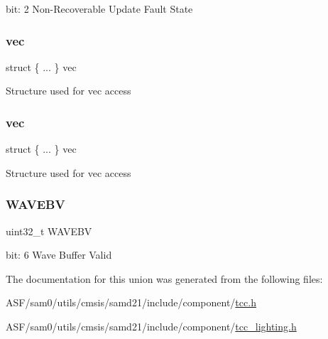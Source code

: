 bit\+: 2 Non-\/\+Recoverable Update Fault State \mbox{\label{union_t_c_c___s_t_a_t_u_s___type_a9b2961e4e05000512943ebf794581bb2}} 
\subsubsection{\texorpdfstring{vec}{vec}\hspace{0.1cm}{\footnotesize\ttfamily [1/2]}}
{\footnotesize\ttfamily struct \{ ... \}   vec}

Structure used for vec access \mbox{\label{union_t_c_c___s_t_a_t_u_s___type_a19d05d88105b0a3f242e35a620b4843d}} 
\subsubsection{\texorpdfstring{vec}{vec}\hspace{0.1cm}{\footnotesize\ttfamily [2/2]}}
{\footnotesize\ttfamily struct \{ ... \}   vec}

Structure used for vec access \mbox{\label{union_t_c_c___s_t_a_t_u_s___type_a7cb2c64456be6bfca67c8cca6126b2fc}} 
\subsubsection{\texorpdfstring{WAVEBV}{WAVEBV}}
{\footnotesize\ttfamily uint32\+\_\+t W\+A\+V\+E\+BV}

bit\+: 6 Wave Buffer Valid 

The documentation for this union was generated from the following files\+:\begin{DoxyCompactItemize}
\item 
A\+S\+F/sam0/utils/cmsis/samd21/include/component/\mbox{\hyperlink{tcc_8h}{tcc.\+h}}\item 
A\+S\+F/sam0/utils/cmsis/samd21/include/component/\mbox{\hyperlink{tcc__lighting_8h}{tcc\+\_\+lighting.\+h}}\end{DoxyCompactItemize}
